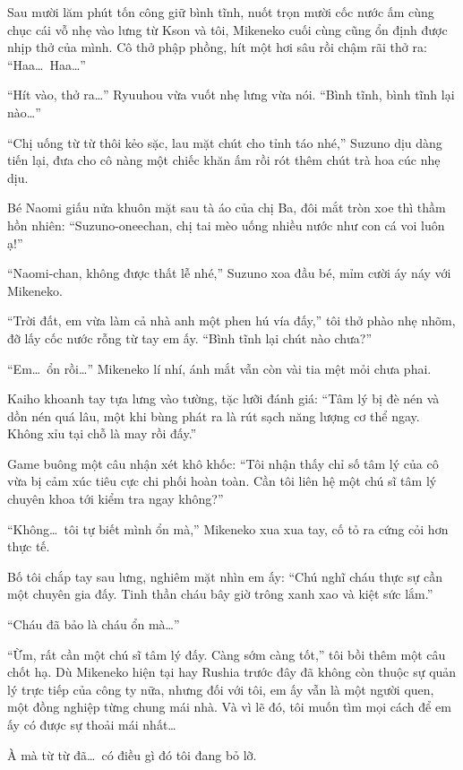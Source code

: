 ﻿\documentclass[../main.tex]{subfiles}
\begin{document}
\ct

Sau mười lăm phút tốn công giữ bình tĩnh, nuốt trọn mười cốc nước ấm cùng chục cái vỗ nhẹ vào lưng từ Kson và tôi, Mikeneko cuối cùng cũng ổn định được nhịp thở của mình. Cô thở phập phồng, hít một hơi sâu rồi chậm rãi thở ra: ``Haa\dots\ Haa\dots''

``Hít vào, thở ra\dots'' Ryuuhou vừa vuốt nhẹ lưng vừa nói. ``Bình tĩnh, bình tĩnh lại nào\dots''

``Chị uống từ từ thôi kẻo sặc, lau mặt chút cho tỉnh táo nhé,'' Suzuno dịu dàng tiến lại, đưa cho cô nàng một chiếc khăn ấm rồi rót thêm chút trà hoa cúc nhẹ dịu.

Bé Naomi giấu nửa khuôn mặt sau tà áo của chị Ba, đôi mắt tròn xoe thì thầm hồn nhiên: ``Suzuno-oneechan, chị tai mèo uống nhiều nước như con cá voi luôn ạ!''

``Naomi-chan, không được thất lễ nhé,'' Suzuno xoa đầu bé, mỉm cười áy náy với Mikeneko.

``Trời đất, em vừa làm cả nhà anh một phen hú vía đấy,'' tôi thở phào nhẹ nhõm, đỡ lấy cốc nước rỗng từ tay em ấy. ``Bình tĩnh lại chút nào chưa?''

``Em\dots\ ổn rồi\dots'' Mikeneko lí nhí, ánh mắt vẫn còn vài tia mệt mỏi chưa phai.

Kaiho khoanh tay tựa lưng vào tường, tặc lưỡi đánh giá: ``Tâm lý bị đè nén và dồn nén quá lâu, một khi bùng phát ra là rút sạch năng lượng cơ thể ngay. Không xỉu tại chỗ là may rồi đấy.''

Game buông một câu nhận xét khô khốc: ``Tôi nhận thấy chỉ số tâm lý của cô vừa bị cảm xúc tiêu cực chi phối hoàn toàn. Cần tôi liên hệ một chú sĩ tâm lý chuyên khoa tới kiểm tra ngay không?''

``Không\dots\ tôi tự biết mình ổn mà,'' Mikeneko xua xua tay, cố tỏ ra cứng cỏi hơn thực tế.

Bố tôi chắp tay sau lưng, nghiêm mặt nhìn em ấy: ``Chú nghĩ cháu thực sự cần một chuyên gia đấy. Tinh thần cháu bây giờ trông xanh xao và kiệt sức lắm.''

``Cháu đã bảo là cháu ổn mà\dots''

``Ừm, rất cần một chú sĩ tâm lý đấy. Càng sớm càng tốt,'' tôi bồi thêm một câu chốt hạ. Dù Mikeneko hiện tại hay Rushia trước đây đã không còn thuộc sự quản lý trực tiếp của công ty nữa, nhưng đối với tôi, em ấy vẫn là một người quen, một đồng nghiệp từng chung mái nhà. Và vì lẽ đó, tôi muốn tìm mọi cách để em ấy có được sự thoải mái nhất\dots

À mà từ từ đã\dots\ có điều gì đó tôi đang bỏ lỡ.
\end{document}
